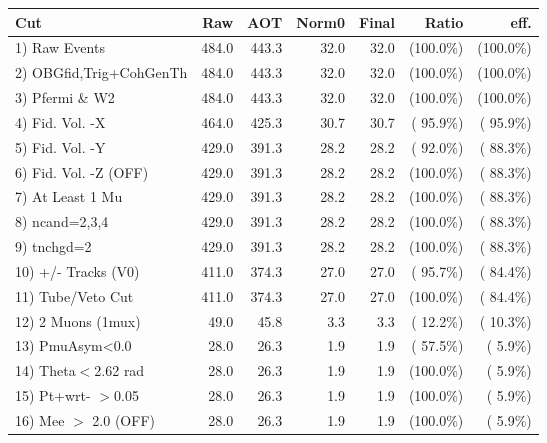  \begin{table}[h!]\centering
 \begin{tabular}{||l||r|r|r|r|r|r||}
 \hline
 \hline
 Cut & Raw & AOT & Norm0 & Final & Ratio & eff.       \\
 \hline
  1) Raw Events           &        484.0 &        443.3 &         32.0 &         32.0 & (100.0\%) & (100.0\%) \\
  2) OBGfid,Trig+CohGenTh &        484.0 &        443.3 &         32.0 &         32.0 & (100.0\%) & (100.0\%) \\
  3) Pfermi \& W2         &        484.0 &        443.3 &         32.0 &         32.0 & (100.0\%) & (100.0\%) \\
  4) Fid. Vol. -X         &        464.0 &        425.3 &         30.7 &         30.7 & ( 95.9\%) & ( 95.9\%) \\
  5) Fid. Vol. -Y         &        429.0 &        391.3 &         28.2 &         28.2 & ( 92.0\%) & ( 88.3\%) \\
  6) Fid. Vol. -Z (OFF)   &        429.0 &        391.3 &         28.2 &         28.2 & (100.0\%) & ( 88.3\%) \\
  7) At Least 1 Mu        &        429.0 &        391.3 &         28.2 &         28.2 & (100.0\%) & ( 88.3\%) \\
  8) ncand=2,3,4          &        429.0 &        391.3 &         28.2 &         28.2 & (100.0\%) & ( 88.3\%) \\
  9) tnchgd=2             &        429.0 &        391.3 &         28.2 &         28.2 & (100.0\%) & ( 88.3\%) \\
 10) +/- Tracks (V0)      &        411.0 &        374.3 &         27.0 &         27.0 & ( 95.7\%) & ( 84.4\%) \\
 11) Tube/Veto Cut        &        411.0 &        374.3 &         27.0 &         27.0 & (100.0\%) & ( 84.4\%) \\
 12) 2 Muons (1mux)       &         49.0 &         45.8 &          3.3 &          3.3 & ( 12.2\%) & ( 10.3\%) \\
 13) PmuAsym<0.0          &         28.0 &         26.3 &          1.9 &          1.9 & ( 57.5\%) & (  5.9\%) \\
 14) Theta$<$2.62 rad     &         28.0 &         26.3 &          1.9 &          1.9 & (100.0\%) & (  5.9\%) \\
 15) Pt+wrt- $>$0.05      &         28.0 &         26.3 &          1.9 &          1.9 & (100.0\%) & (  5.9\%) \\
 16) Mee $>$ 2.0  (OFF)   &         28.0 &         26.3 &          1.9 &          1.9 & (100.0\%) & (  5.9\%) \\

\end{tabular}
\end{table}
